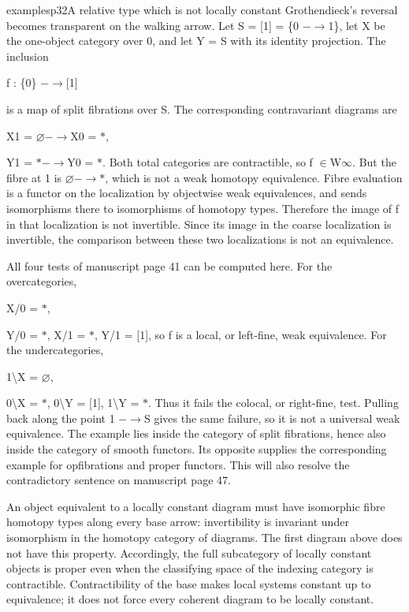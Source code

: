 \begin{dcomment}{examples}{p32}{A relative type which is not locally constant}
Grothendieck’s reversal becomes transparent on the walking arrow. Let S = [1] = \{0 \ensuremath{-}\ensuremath{\to}1\}, let X be the one-object category over 0, and let Y = S with its identity projection. The inclusion

f : \{0\} \ensuremath{-}\ensuremath{\to}[1]

is a map of split fibrations over S. The corresponding contravariant diagrams are

X1 = \ensuremath{\varnothing}\ensuremath{-}\ensuremath{\to}X0 = \ensuremath{*},

Y1 = \ensuremath{*}\ensuremath{-}\ensuremath{\to}Y0 = \ensuremath{*}. Both total categories are contractible, so f \ensuremath{\in}W\ensuremath{\infty}. But the fibre at 1 is \ensuremath{\varnothing}\ensuremath{-}\ensuremath{\to}\ensuremath{*}, which is not a weak homotopy equivalence. Fibre evaluation is a functor on the localization by objectwise weak equivalences, and sends isomorphisms there to isomorphisms of homotopy types. Therefore the image of f in that localization is not invertible. Since its image in the coarse localization is invertible, the comparison between these two localizations is not an equivalence.

All four tests of manuscript page 41 can be computed here. For the overcategories,

X/0 = \ensuremath{*},

Y/0 = \ensuremath{*}, X/1 = \ensuremath{*}, Y/1 = [1], so f is a local, or left-fine, weak equivalence. For the undercategories,

1\textbackslash{}X = \ensuremath{\varnothing},

0\textbackslash{}X = \ensuremath{*}, 0\textbackslash{}Y = [1], 1\textbackslash{}Y = \ensuremath{*}. Thus it fails the colocal, or right-fine, test. Pulling back along the point 1 \ensuremath{-}\ensuremath{\to}S gives the same failure, so it is not a universal weak equivalence. The example lies inside the category of split fibrations, hence also inside the category of smooth functors. Its opposite supplies the corresponding example for opfibrations and proper functors. This will also resolve the contradictory sentence on manuscript page 47.

An object equivalent to a locally constant diagram must have isomorphic fibre homotopy types along every base arrow: invertibility is invariant under isomorphism in the homotopy category of diagrams. The first diagram above does not have this property. Accordingly, the full subcategory of locally constant objects is proper even when the classifying space of the indexing category is contractible. Contractibility of the base makes local systems constant up to equivalence; it does not force every coherent diagram to be locally constant.


\end{dcomment}
